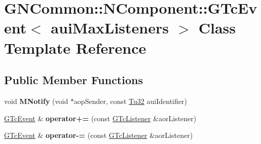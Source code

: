 \hypertarget{class_g_n_common_1_1_n_component_1_1_g_tc_event}{}\section{G\+N\+Common\+:\+:N\+Component\+:\+:G\+Tc\+Event$<$ aui\+Max\+Listeners $>$ Class Template Reference}
\label{class_g_n_common_1_1_n_component_1_1_g_tc_event}
\subsection*{Public Member Functions}
\begin{DoxyCompactItemize}
\item 
\mbox{\label{class_g_n_common_1_1_n_component_1_1_g_tc_event_aa4b6f4ff1c4b91c55ac4c7350174bde8}} 
void {\bfseries M\+Notify} (void $\ast$aop\+Sender, const \mbox{\hyperlink{namespace_g_n_common_a941b527ef318f318aed7903dc832b7e4}{Tu32}} aui\+Identifier)
\item 
\mbox{\label{class_g_n_common_1_1_n_component_1_1_g_tc_event_adda36d639b1a0ddc31316559a1cddec9}} 
\mbox{\hyperlink{class_g_n_common_1_1_n_component_1_1_g_tc_event}{G\+Tc\+Event}} \& {\bfseries operator+=} (const \mbox{\hyperlink{class_g_n_common_1_1_n_component_1_1_g_tc_listener}{G\+Tc\+Listener}} \&aor\+Listener)
\item 
\mbox{\label{class_g_n_common_1_1_n_component_1_1_g_tc_event_a5ecf841886dd8741f88ed053bb7c50ab}} 
\mbox{\hyperlink{class_g_n_common_1_1_n_component_1_1_g_tc_event}{G\+Tc\+Event}} \& {\bfseries operator-\/=} (const \mbox{\hyperlink{class_g_n_common_1_1_n_component_1_1_g_tc_listener}{G\+Tc\+Listener}} \&aor\+Listener)
\end{DoxyCompactItemize}
